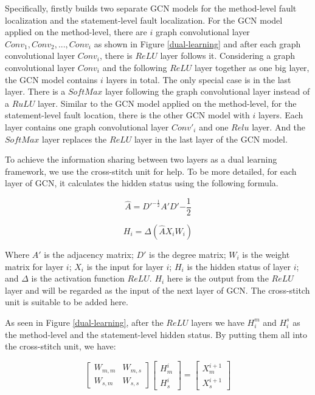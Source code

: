 Specifically, \tool firstly builds two separate GCN models \cite{kipf2016semi} for the method-level fault localization and the statement-level fault localization. For the GCN model applied on the method-level, there are $i$ graph convolutional layer $Conv_1, Conv_2, ..., Conv_i$ as shown in Figure \ref{dual-learning} and after each graph convolutional layer $Conv_i$, there is $ReLU$ layer follows it. Considering a graph convolutional layer $Conv_i$ and the following $ReLU$ layer together as one big layer, the GCN model contains $i$ layers in total. The only special case is in the last layer. There is a $SoftMax$ layer following the graph convolutional layer instead of a $RuLU$ layer. Similar to the GCN model applied on the method-level, for the statement-level fault location, there is the other GCN model with $i$ layers. Each layer contains one graph convolutional layer $Conv'_i$ and one $Relu$ layer. And the $SoftMax$ layer replaces the $ReLU$ layer in the last layer of the GCN model.

To achieve the information sharing between two layers as a dual learning framework, we use the cross-stitch unit \cite{misra2016cross} for help. To be more detailed, for each layer of GCN, it calculates the hidden status using the following formula.

\begin{equation}\label{eq:1}
	\hat{A} = D'^{-\frac{1}{2}}A'D'{-\frac{1}{2}}
\end{equation}

\begin{equation}\label{eq:2}
	H_i = \Delta(\hat{A}X_iW_i)
\end{equation}

Where $A'$ is the adjacency matrix; $D'$ is the degree matrix; $W_i$ is the weight matrix for layer $i$; $X_i$ is the input for layer $i$; $H_i$ is the hidden status of layer $i$; and $\Delta$ is the activation function $ReLU$. $H_i$ here is the output from the $ReLU$ layer and will be regarded as the input of the next layer of GCN. The cross-stitch unit is suitable to be added here.

As seen in Figure \ref{dual-learning}, after the $ReLU$ layers we have $H_i^m$ and $H_i^s$ as the method-level and the statement-level hidden status. By putting them all into the cross-stitch unit, we have:

\begin{equation}\label{eq:3}
	\begin{bmatrix}
		W_{m,m} &  W_{m,s} \\
		W_{s,m} &  W_{s,s}
	\end{bmatrix}
	\begin{bmatrix}
		H_m^{i}\\
		H_s^{i}
	\end{bmatrix}=
	\begin{bmatrix}
		X_m^{i+1}\\
		X_s^{i+1}
	\end{bmatrix}
\end{equation}

